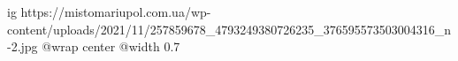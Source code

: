  
 
 
 
 

\ifcmt
  ig https://mistomariupol.com.ua/wp-content/uploads/2021/11/257859678_4793249380726235_376595573503004316_n-2.jpg
  @wrap center
  @width 0.7
\fi
